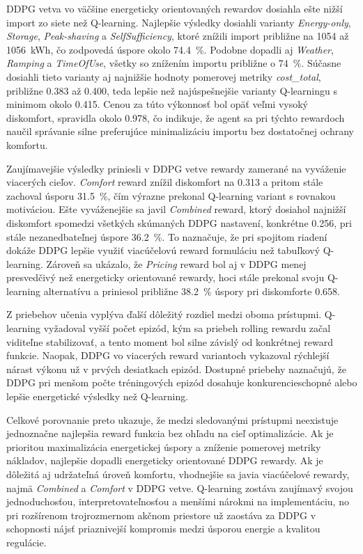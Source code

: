 \documentclass[conference]{IEEEtran}
\begin{document}
DDPG vetva vo väčšine energeticky orientovaných rewardov dosiahla ešte nižší import zo siete než Q-learning. Najlepšie výsledky dosiahli varianty \textit{Energy-only}, \textit{Storage}, \textit{Peak-shaving} a \textit{SelfSufficiency}, ktoré znížili import približne na 1054 až 1056~kWh, čo zodpovedá úspore okolo 74.4~\%. Podobne dopadli aj \textit{Weather}, \textit{Ramping} a \textit{TimeOfUse}, všetky so znížením importu približne o 74~\%. Súčasne dosiahli tieto varianty aj najnižšie hodnoty pomerovej metriky \textit{cost\_total}, približne 0.383 až 0.400, teda lepšie než najúspešnejšie varianty Q-learningu s minimom okolo 0.415. Cenou za túto výkonnosť bol opäť veľmi vysoký diskomfort, spravidla okolo 0.978, čo indikuje, že agent sa pri týchto rewardoch naučil správanie silne preferujúce minimalizáciu importu bez dostatočnej ochrany komfortu.

Zaujímavejšie výsledky priniesli v DDPG vetve rewardy zamerané na vyváženie viacerých cieľov. \textit{Comfort} reward znížil diskomfort na 0.313 a pritom stále zachoval úsporu 31.5~\%, čím výrazne prekonal Q-learning variant s rovnakou motiváciou. Ešte vyváženejšie sa javil \textit{Combined} reward, ktorý dosiahol najnižší diskomfort spomedzi všetkých skúmaných DDPG nastavení, konkrétne 0.256, pri stále nezanedbateľnej úspore 36.2~\%. To naznačuje, že pri spojitom riadení dokáže DDPG lepšie využiť viacúčelovú reward formuláciu než tabuľkový Q-learning. Zároveň sa ukázalo, že \textit{Pricing} reward bol aj v DDPG menej presvedčivý než energeticky orientované rewardy, hoci stále prekonal svoju Q-learning alternatívu a priniesol približne 38.2~\% úspory pri diskomforte 0.658.

Z priebehov učenia vyplýva ďalší dôležitý rozdiel medzi oboma prístupmi. Q-learning vyžadoval vyšší počet epizód, kým sa priebeh rolling rewardu začal viditeľne stabilizovať, a tento moment bol silne závislý od konkrétnej reward funkcie. Naopak, DDPG vo viacerých reward variantoch vykazoval rýchlejší nárast výkonu už v prvých desiatkach epizód. Dostupné priebehy naznačujú, že DDPG pri menšom počte tréningových epizód dosahuje konkurencieschopné alebo lepšie energetické výsledky než Q-learning.

Celkové porovnanie preto ukazuje, že medzi sledovanými prístupmi neexistuje jednoznačne najlepšia reward funkcia bez ohľadu na cieľ optimalizácie. Ak je prioritou maximalizácia energetickej úspory a zníženie pomerovej metriky nákladov, najlepšie dopadli energeticky orientované DDPG rewardy. Ak je dôležitá aj udržateľná úroveň komfortu, vhodnejšie sa javia viacúčelové rewardy, najmä \textit{Combined} a \textit{Comfort} v DDPG vetve. Q-learning zostáva zaujímavý svojou jednoduchosťou, interpretovateľnosťou a menšími nárokmi na implementáciu, no pri rozšírenom trojrozmernom akčnom priestore už zaostáva za DDPG v schopnosti nájsť priaznivejší kompromis medzi úsporou energie a kvalitou regulácie.
\end{document}
